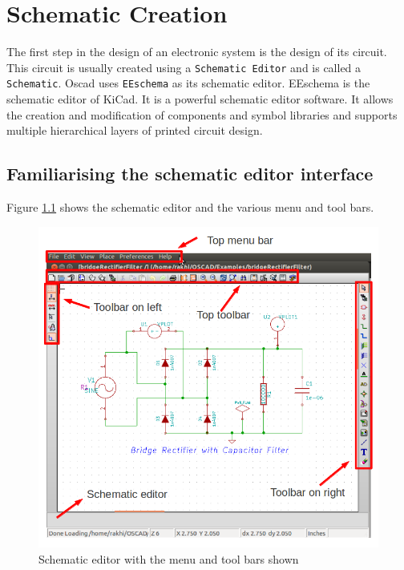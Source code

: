 
%

\chapter{Schematic Creation}
\label{schem}
The first step in the design of an electronic system is the design of its circuit. This circuit is usually created using a {\tt Schematic Editor} and is called a {\tt Schematic}. Oscad uses {\tt EEschema}  as its schematic editor. EEschema is the schematic editor of KiCad. It is a powerful schematic editor software. It allows the creation and  modification of components and symbol libraries and supports multiple hierarchical layers of printed circuit design.

\section{Familiarising the schematic editor interface}
Figure \ref{eesch1} shows the schematic editor and the various menu and tool bars. 
\begin{figure}
\begin{center}
\includegraphics[width=\linewidth]{figures/eeschema1_corctd.png}%
\caption{Schematic editor with the menu and tool bars shown}
\label{eesch1}
\end{center}
\end{figure}



